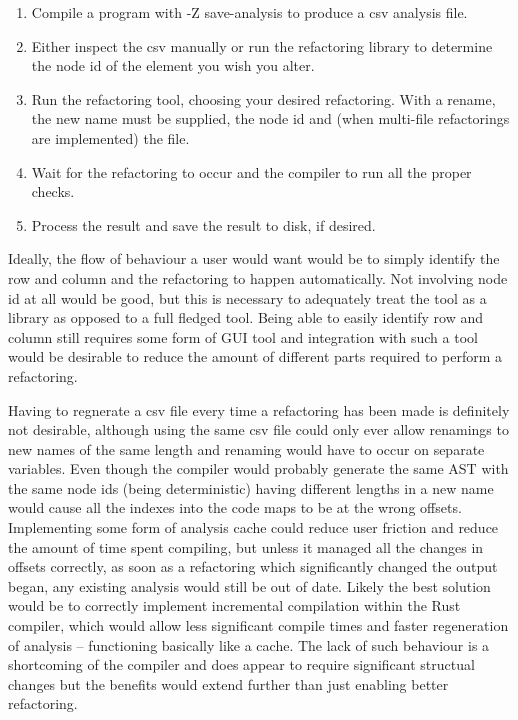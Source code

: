\begin{enumerate}
\item Compile a program with -Z save-analysis to produce a csv analysis file.
\item Either inspect the csv manually or run the refactoring library to determine the node id of the element you wish you alter.
\item Run the refactoring tool, choosing your desired refactoring. With a rename, the new name must be supplied, the node id and (when multi-file refactorings are implemented) the file.
\item Wait for the refactoring to occur and the compiler to run all the proper checks. 
\item Process the result and save the result to disk, if desired.
\end{enumerate}

Ideally, the flow of behaviour a user would want would be to simply identify the row and column and the refactoring to happen automatically. Not involving node id at all would be good, but this is necessary to adequately treat the tool as a library as opposed to a full fledged tool. Being able to easily identify row and column still requires some form of GUI tool and integration with such a tool would be desirable to reduce the amount of different parts required to perform a refactoring. 

Having to regnerate a csv file every time a refactoring has been made is definitely not desirable, although using the same csv file could only ever allow renamings to new names of the same length and renaming would have to occur on separate variables. Even though the compiler would probably generate the same AST with the same node ids (being deterministic) having different lengths in a new name would cause all the indexes into the code maps to be at the wrong offsets. Implementing some form of analysis cache could reduce user friction and reduce the amount of time spent compiling, but unless it managed all the changes in offsets correctly, as soon as a refactoring which significantly changed the output began, any existing analysis would still be out of date. Likely the best solution would be to correctly implement incremental compilation within the Rust compiler, which would allow less significant compile times and faster regeneration of analysis -- functioning basically like a cache. The lack of such behaviour is a shortcoming of the compiler and does appear to require significant structual changes but the benefits would extend further than just enabling better refactoring.

